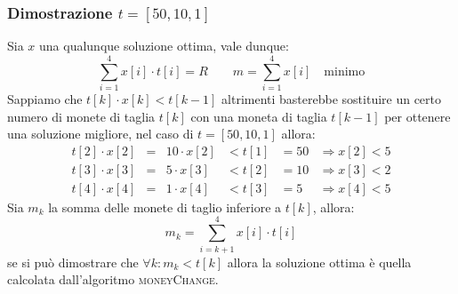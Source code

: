         \subsubsection{Dimostrazione $t=[50,10,1]$}
            Sia $x$ una qualunque soluzione ottima, vale dunque:
            $$
                \sum_{i=1}^4 x[i] \cdot t[i] = R \qquad m = \sum_{i=1}^4 x[i] \quad \text{minimo}
            $$
            Sappiamo che $t[k] \cdot x[k] < t[k-1]$ altrimenti basterebbe sostituire un certo numero di monete di taglia $t[k]$ con una moneta di taglia $t[k-1]$ per ottenere una soluzione migliore, nel caso di $t=[50,10,1]$ allora:
            $$
                \begin{aligned}
                    t[2]\cdot x[2] &=&10\cdot x[2] &<t[1]&=50&\Rightarrow x[2]<5\\
                    t[3]\cdot x[3] &=&5\cdot x[3] &<t[2]&=10&\Rightarrow x[3]<2\\
                    t[4]\cdot x[4] &=&1\cdot x[4] &<t[3]&=5&\Rightarrow x[4]<5
                \end{aligned}
            $$
            Sia $m_k$ la somma delle monete di taglio inferiore a $t[k]$, allora:
            $$
                m_k = \sum_{i=k+1}^4 x[i] \cdot t[i]
            $$
            se si può dimostrare che $\forall k: m_k < t[k]$ allora la soluzione ottima è quella calcolata dall'algoritmo \textsc{moneyChange}.
